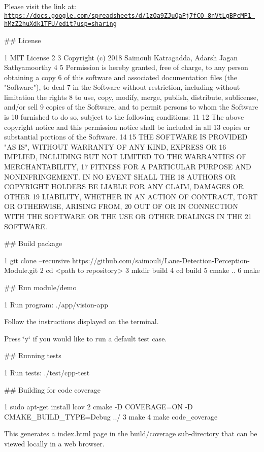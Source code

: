 Please visit the link at\+: \href{https://docs.google.com/spreadsheets/d/1zOa9ZJuQaPj7fCO_8nVtLgBPcMP1-hMzZ2huXdk1TFU/edit?usp=sharing}{\tt https\+://docs.\+google.\+com/spreadsheets/d/1z\+Oa9\+Z\+Ju\+Qa\+Pj7f\+C\+O\+\_\+8n\+Vt\+Lg\+B\+Pc\+M\+P1-\/h\+Mz\+Z2hu\+Xdk1\+T\+F\+U/edit?usp=sharing}

\#\# License 
\begin{DoxyCode}
1 MIT License
2 
3 Copyright (c) 2018 Saimouli Katragadda, Adarsh Jagan Sathyamoorthy
4 
5 Permission is hereby granted, free of charge, to any person obtaining a copy
6 of this software and associated documentation files (the "Software"), to deal
7 in the Software without restriction, including without limitation the rights
8 to use, copy, modify, merge, publish, distribute, sublicense, and/or sell
9 copies of the Software, and to permit persons to whom the Software is
10 furnished to do so, subject to the following conditions:
11 
12 The above copyright notice and this permission notice shall be included in all
13 copies or substantial portions of the Software.
14 
15 THE SOFTWARE IS PROVIDED "AS IS", WITHOUT WARRANTY OF ANY KIND, EXPRESS OR
16 IMPLIED, INCLUDING BUT NOT LIMITED TO THE WARRANTIES OF MERCHANTABILITY,
17 FITNESS FOR A PARTICULAR PURPOSE AND NONINFRINGEMENT. IN NO EVENT SHALL THE
18 AUTHORS OR COPYRIGHT HOLDERS BE LIABLE FOR ANY CLAIM, DAMAGES OR OTHER
19 LIABILITY, WHETHER IN AN ACTION OF CONTRACT, TORT OR OTHERWISE, ARISING FROM,
20 OUT OF OR IN CONNECTION WITH THE SOFTWARE OR THE USE OR OTHER DEALINGS IN THE
21 SOFTWARE.
\end{DoxyCode}
 \#\# Build package 
\begin{DoxyCode}
1 git clone --recursive https://github.com/saimouli/Lane-Detection-Perception-Module.git
2 cd <path to repository>
3 mkdir build
4 cd build
5 cmake ..
6 make
\end{DoxyCode}
 \#\# Run module/demo 
\begin{DoxyCode}
1 Run program: ./app/vision-app
\end{DoxyCode}
 Follow the instructions displayed on the terminal.

Press \char`\"{}y\char`\"{} if you would like to run a default test case.

\#\# Running tests 
\begin{DoxyCode}
1 Run tests: ./test/cpp-test
\end{DoxyCode}
 \#\# Building for code coverage 
\begin{DoxyCode}
1 sudo apt-get install lcov
2 cmake -D COVERAGE=ON -D CMAKE\_BUILD\_TYPE=Debug ../
3 make
4 make code\_coverage
\end{DoxyCode}
 This generates a index.\+html page in the build/coverage sub-\/directory that can be viewed locally in a web browser.

